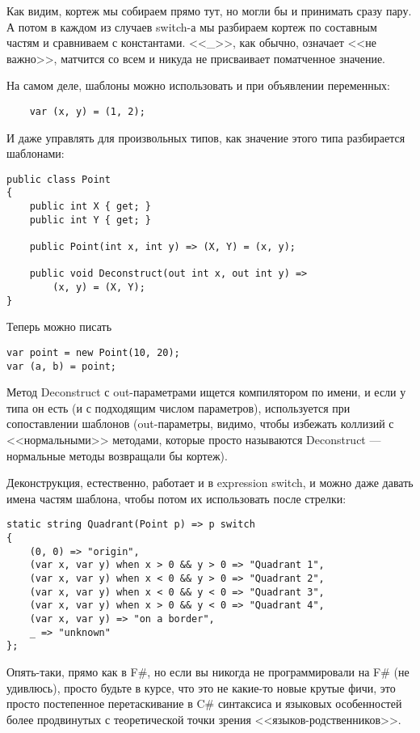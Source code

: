 \documentclass{../../text-style}
\begin{document}
Как видим, кортеж мы собираем прямо тут, но могли бы и принимать сразу пару. А потом в каждом из случаев switch-а мы разбираем кортеж по составным частям и сравниваем с константами. <<\_>>, как обычно, означает <<не важно>>, матчится со всем и никуда не присваивает поматченное значение.

На самом деле, шаблоны можно использовать и при объявлении переменных:

\begin{verbatim}
    var (x, y) = (1, 2);
\end{verbatim}

И даже управлять для произвольных типов, как значение этого типа разбирается шаблонами:

\begin{verbatim}
public class Point
{
    public int X { get; }
    public int Y { get; }

    public Point(int x, int y) => (X, Y) = (x, y);

    public void Deconstruct(out int x, out int y) =>
        (x, y) = (X, Y);
}
\end{verbatim}

Теперь можно писать

\begin{verbatim}
var point = new Point(10, 20);
var (a, b) = point;
\end{verbatim}

Метод Deconstruct с out-параметрами ищется компилятором по имени, и если у типа он есть (и с подходящим числом параметров), используется при сопоставлении шаблонов (out-параметры, видимо, чтобы избежать коллизий с <<нормальными>> методами, которые просто называются Deconstruct --- нормальные методы возвращали бы кортеж).

Деконструкция, естественно, работает и в expression switch, и можно даже давать имена частям шаблона, чтобы потом их использовать после стрелки:

\begin{verbatim}
static string Quadrant(Point p) => p switch
{
    (0, 0) => "origin",
    (var x, var y) when x > 0 && y > 0 => "Quadrant 1",
    (var x, var y) when x < 0 && y > 0 => "Quadrant 2",
    (var x, var y) when x < 0 && y < 0 => "Quadrant 3",
    (var x, var y) when x > 0 && y < 0 => "Quadrant 4",
    (var x, var y) => "on a border",
    _ => "unknown"
};
\end{verbatim}

Опять-таки, прямо как в F\#, но если вы никогда не программировали на F\# (не удивлюсь), просто будьте в курсе, что это не какие-то новые крутые фичи, это просто постепенное перетаскивание в C\# синтаксиса и языковых особенностей более продвинутых с теоретической точки зрения <<языков-родственников>>.
\end{document}

